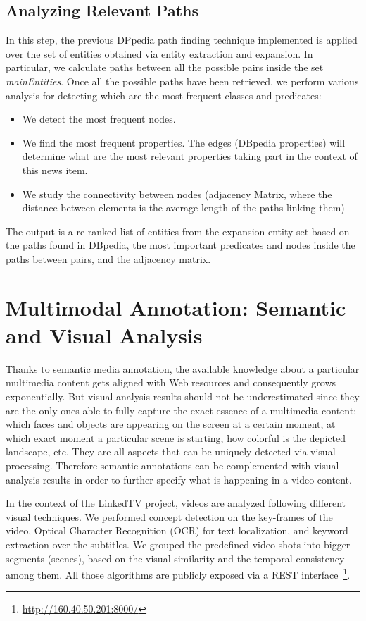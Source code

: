 \documentclass[a4paper,11pt]{report}
\begin{document}
\subsection{Analyzing Relevant Paths}
In this step, the previous DPpedia path finding technique implemented is applied over the set of entities obtained via entity extraction and expansion. In particular, we calculate paths between all the possible pairs inside the set \textit{mainEntities}. Once all the possible paths have been retrieved, we perform various analysis for detecting which are the most frequent classes and predicates:
\begin{itemize}
  \item We detect the most frequent nodes.
  \item We find the most frequent properties. The edges (DBpedia properties) will determine what are the most relevant properties taking part in the context of this news item.
  \item We study the connectivity between nodes (adjacency Matrix, where the distance between elements is the average length of the paths linking them)
\end{itemize}
The output is a re-ranked list of entities from the expansion entity set based on the paths found in DBpedia, the most important predicates and nodes inside the paths between pairs, and the adjacency matrix.

\section{Multimodal Annotation: Semantic and Visual Analysis}
Thanks to semantic media annotation, the available knowledge about a particular multimedia content gets aligned with Web resources and consequently grows exponentially. But visual analysis results should not be underestimated since they are the only ones able to fully capture the exact essence of a multimedia content: which faces and objects are appearing on the screen at a certain moment, at which exact moment a particular scene is starting, how colorful is the depicted landscape, etc. They are all aspects that can be uniquely detected via visual processing. Therefore semantic annotations can be complemented with visual analysis results in order to further specify what is happening in a video content.

In the context of the LinkedTV project, videos are analyzed following different visual techniques. We performed concept detection on the key-frames of the video, Optical Character Recognition (OCR) for text localization, and keyword extraction over the subtitles. We grouped the predefined video shots into bigger segments (scenes), based on the visual similarity and the temporal consistency among them. All those algorithms are publicly exposed via a REST interface~\footnote{\url{http://160.40.50.201:8000/}}.
\end{document}
